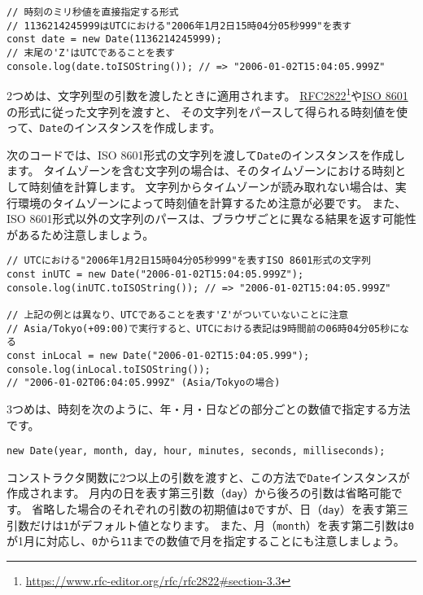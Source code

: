 \enlargethispage{\baselineskip}\begin{lstlisting}
// 時刻のミリ秒値を直接指定する形式
// 1136214245999はUTCにおける"2006年1月2日15時04分05秒999"を表す
const date = new Date(1136214245999);
// 末尾の'Z'はUTCであることを表す
console.log(date.toISOString()); // => "2006-01-02T15:04:05.999Z"
\end{lstlisting}

2つめは、文字列型の引数を渡したときに適用されます。
\href{https://www.rfc-editor.org/rfc/rfc2822\#section-3.3}{RFC2822}\footnote{\url{https://www.rfc-editor.org/rfc/rfc2822\#section-3.3}}や\href{https://ja.wikipedia.org/wiki/ISO_8601}{ISO
8601}の形式に従った文字列を渡すと、
その文字列をパースして得られる時刻値を使って、\texttt{Date}のインスタンスを作成します。

次のコードでは、ISO
8601形式の文字列を渡して\texttt{Date}のインスタンスを作成します。
タイムゾーンを含む文字列の場合は、そのタイムゾーンにおける時刻として時刻値を計算します。
文字列からタイムゾーンが読み取れない場合は、実行環境のタイムゾーンによって時刻値を計算するため注意が必要です。
また、ISO
8601形式以外の文字列のパースは、ブラウザごとに異なる結果を返す可能性があるため注意しましょう。

\begin{lstlisting}
// UTCにおける"2006年1月2日15時04分05秒999"を表すISO 8601形式の文字列
const inUTC = new Date("2006-01-02T15:04:05.999Z");
console.log(inUTC.toISOString()); // => "2006-01-02T15:04:05.999Z"

// 上記の例とは異なり、UTCであることを表す'Z'がついていないことに注意
// Asia/Tokyo(+09:00)で実行すると、UTCにおける表記は9時間前の06時04分05秒になる
const inLocal = new Date("2006-01-02T15:04:05.999");
console.log(inLocal.toISOString()); 
// "2006-01-02T06:04:05.999Z" (Asia/Tokyoの場合)
\end{lstlisting}

3つめは、時刻を次のように、年・月・日などの部分ごとの数値で指定する方法です。

\begin{lstlisting}
new Date(year, month, day, hour, minutes, seconds, milliseconds);
\end{lstlisting}

コンストラクタ関数に2つ以上の引数を渡すと、この方法で\texttt{Date}インスタンスが作成されます。
月内の日を表す第三引数（\texttt{day}）から後ろの引数は省略可能です。
省略した場合のそれぞれの引数の初期値は\texttt{0}ですが、日（\texttt{day}）を表す第三引数だけは\texttt{1}がデフォルト値となります。
また、月（\texttt{month}）を表す第二引数は\texttt{0}が1月に対応し、\texttt{0}から\texttt{11}までの数値で月を指定することにも注意しましょう。

